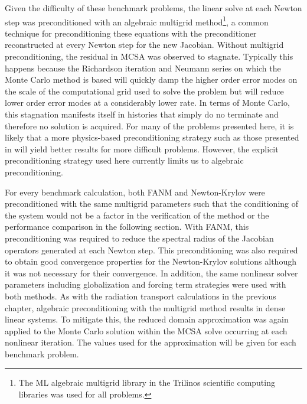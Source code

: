 Given the difficulty of these benchmark problems, the linear solve at
each Newton step was preconditioned with an algebraic multigrid
method\footnote{The ML algebraic multigrid library in the Trilinos
  scientific computing libraries \cite{heroux_overview_2005} was used
  for all problems.}, a common technique for preconditioning these
equations \cite{ghia_high-re_1982,evans_enhanced_2007} with the
preconditioner reconstructed at every Newton step for the new
Jacobian. Without multigrid preconditioning, the residual in MCSA was
observed to stagnate. Typically this happens because the Richardson
iteration and Neumann series on which the Monte Carlo method is based
will quickly damp the higher order error modes on the scale of the
computational grid used to solve the problem but will reduce lower
order error modes at a considerably lower rate. In terms of Monte
Carlo, this stagnation manifests itself in histories that simply do no
terminate and therefore no solution is acquired. For many of the
problems presented here, it is likely that a more physics-based
preconditioning strategy such as those presented in
\cite{evans_development_2006,evans_enhanced_2007} will yield better
results for more difficult problems. However, the explicit
preconditioning strategy used here currently limits us to algebraic
preconditioning.

For every benchmark calculation, both FANM and Newton-Krylov were
preconditioned with the same multigrid parameters such that the
conditioning of the system would not be a factor in the verification
of the method or the performance comparison in the following
section. With FANM, this preconditioning was required to reduce the
spectral radius of the Jacobian operators generated at each Newton
step. This preconditioning was also required to obtain good
convergence properties for the Newton-Krylov solutions although it was
not necessary for their convergence. In addition, the same nonlinear
solver parameters including globalization and forcing term strategies
were used with both methods. As with the radiation transport
calculations in the previous chapter, algebraic preconditioning with
the multigrid method results in dense linear systems. To mitigate
this, the reduced domain approximation was again applied to the Monte
Carlo solution within the MCSA solve occurring at each nonlinear
iteration. The values used for the approximation will be given for
each benchmark problem.

